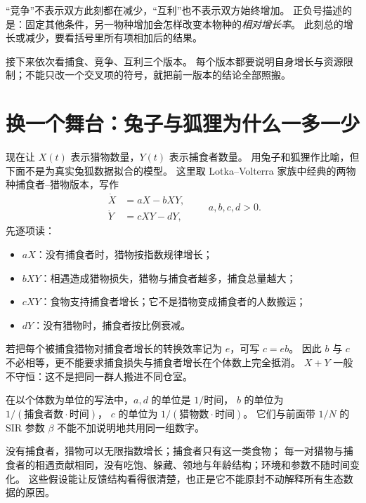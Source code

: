 \documentclass[UTF8,11pt,fontset=none]{ctexart}
\begin{document}
\begin{warnbox}
“竞争”不表示双方此刻都在减少，“互利”也不表示双方始终增加。
正负号描述的是：固定其他条件，另一物种增加会怎样改变本物种的\emph{相对增长率}。
此刻总的增长或减少，要看括号里所有项相加后的结果。
\end{warnbox}

接下来依次看捕食、竞争、互利三个版本。
每个版本都要说明自身增长与资源限制；不能只改一个交叉项的符号，就把前一版本的结论全部照搬。

\section{换一个舞台：兔子与狐狸为什么一多一少}
现在让 $X(t)$ 表示猎物数量，$Y(t)$ 表示捕食者数量。
用兔子和狐狸作比喻，但下面不是为真实兔狐数据拟合的模型。
这里取 Lotka--Volterra 家族中经典的两物种捕食者--猎物版本，写作
\begin{equation}\label{eq:lv}
\boxed{\begin{aligned}
\dot X&=aX-bXY,\\
\dot Y&=cXY-dY,
\end{aligned}\qquad a,b,c,d>0.}
\end{equation}
先逐项读：
\begin{itemize}
\item $aX$：没有捕食者时，猎物按指数规律增长；
\item $bXY$：相遇造成猎物损失，猎物与捕食者越多，捕食总量越大；
\item $cXY$：食物支持捕食者增长；它不是猎物变成捕食者的人数搬运；
\item $dY$：没有猎物时，捕食者按比例衰减。
\end{itemize}
若把每个被捕食猎物对捕食者增长的转换效率记为 $e$，可写 $c=eb$。
因此 $b$ 与 $c$ 不必相等，更不能要求捕食损失与捕食者增长在个体数上完全抵消。
$X+Y$ 一般不守恒：这不是把同一群人搬进不同仓室。

在以个体数为单位的写法中，$a,d$ 的单位是 $1/\text{时间}$，
$b$ 的单位为 $1/(\text{捕食者数}\cdot\text{时间})$，
$c$ 的单位为 $1/(\text{猎物数}\cdot\text{时间})$。
它们与前面带 $1/N$ 的 SIR 参数 $\beta$ 不能不加说明地共用同一组数字。

\begin{warnbox}[经典版本把什么省掉了]
没有捕食者，猎物可以无限指数增长；捕食者只有这一类食物；
每一对猎物与捕食者的相遇贡献相同，没有吃饱、躲藏、领地与年龄结构；环境和参数不随时间变化。
这些假设能让反馈结构看得很清楚，也正是它不能原封不动解释所有生态数据的原因。
\end{warnbox}
\end{document}

